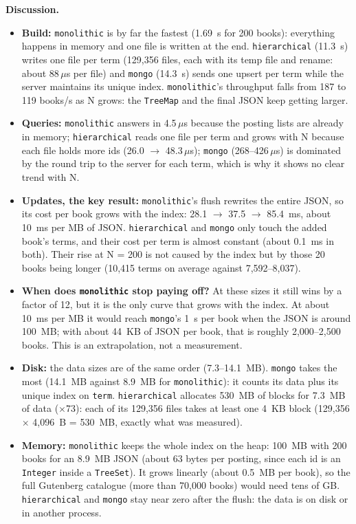 \documentclass[11pt,a4paper]{article}
\newcommand{\code}[1]{\texttt{#1}}
\newcommand{\us}{\,$\mu$s}
\begin{document}
\textbf{Discussion.}
\begin{itemize}
  \item \textbf{Build:} \code{monolithic} is by far the fastest (1.69~s for 200 books): everything
        happens in memory and one file is written at the end. \code{hierarchical} (11.3~s) writes
        one file per term (129,356 files, each with its temp file and rename: about 88\us{} per
        file) and \code{mongo} (14.3~s) sends one upsert per term while the server maintains its
        unique index. \code{monolithic}'s throughput falls from 187 to 119 books/s as N grows: the
        \code{TreeMap} and the final JSON keep getting larger.
  \item \textbf{Queries:} \code{monolithic} answers in 4.5\us{} because the posting lists are
        already in memory; \code{hierarchical} reads one file per term and grows with N because each
        file holds more ids (26.0 $\rightarrow$ 48.3\us); \code{mongo} (268--426\us) is dominated by
        the round trip to the server for each term, which is why it shows no clear trend with N.
  \item \textbf{Updates, the key result:} \code{monolithic}'s flush rewrites the entire JSON, so
        its cost per book grows with the index: 28.1 $\rightarrow$ 37.5 $\rightarrow$ 85.4~ms, about
        10~ms per MB of JSON. \code{hierarchical} and \code{mongo} only touch the added book's terms,
        and their cost per term is almost constant (about 0.1~ms in both). Their rise at N = 200 is
        not caused by the index but by those 20 books being longer (10,415 terms on average against
        7,592--8,037).
  \item \textbf{When does \code{monolithic} stop paying off?} At these sizes it still wins by a
        factor of 12, but it is the only curve that grows with the index. At about 10~ms per MB it
        would reach \code{mongo}'s 1~s per book when the JSON is around 100~MB; with about 44~KB of
        JSON per book, that is roughly 2,000--2,500 books. This is an extrapolation, not a
        measurement.
  \item \textbf{Disk:} the data sizes are of the same order (7.3--14.1~MB). \code{mongo} takes the
        most (14.1~MB against 8.9~MB for \code{monolithic}): it counts its data plus its unique index
        on \code{term}. \code{hierarchical} allocates 530~MB of blocks for 7.3~MB of data
        ($\times$73): each of its 129,356 files takes at least one 4~KB block
        (129,356 $\times$ 4,096~B = 530~MB, exactly what was measured).
  \item \textbf{Memory:} \code{monolithic} keeps the whole index on the heap: 100~MB with 200 books
        for an 8.9~MB JSON (about 63 bytes per posting, since each id is an \code{Integer} inside a
        \code{TreeSet}). It grows linearly (about 0.5~MB per book), so the full Gutenberg catalogue
        (more than 70,000 books) would need tens of GB. \code{hierarchical} and \code{mongo} stay
        near zero after the flush: the data is on disk or in another process.
\end{itemize}
\end{document}
